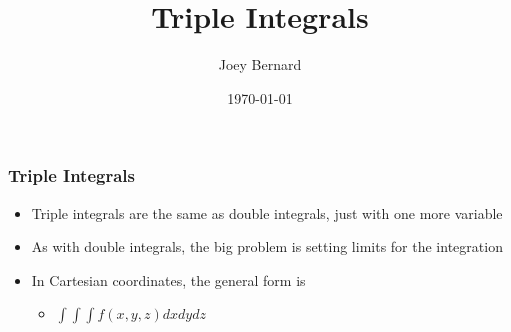 \documentclass{beamer}
\title{Triple Integrals}
\author{Joey Bernard}
\institute{University of New Brunswick}
\date{\today}
\begin{document}
\begin{frame}
  \titlepage
\end{frame}

\begin{frame}
  \frametitle{Triple Integrals}
  \begin{itemize}
  \item Triple integrals are the same as double integrals, just with one more variable
  \item As with double integrals, the big problem is setting limits for the integration
  \item In Cartesian coordinates, the general form is
    \begin{itemize}
    \item $\int\int\int f(x,y,z) dx dy dz$
    \end{itemize}
  \end{itemize}
\end{frame}
\end{document}
